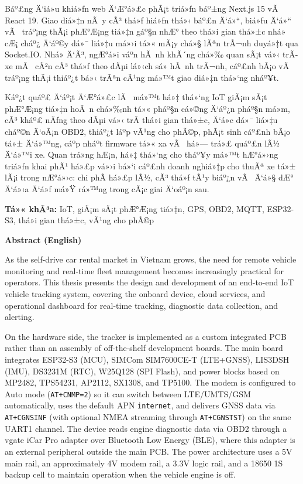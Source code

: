 \documentclass[a4paper]{extarticle}
\begin{document}
Báº£ng Ä‘iá»u khiá»ƒn web Ä‘Æ°á»£c phÃ¡t triá»ƒn báº±ng Next.js 15 vÃ  React 19. Giao
 diá»‡n nÃ y cÃ³ thá»ƒ hiá»ƒn thá»‹ báº£n Ä‘á»“, biá»ƒu Ä‘á»“ vÃ  tráº¡ng thÃ¡i phÆ°Æ¡ng tiá»‡n gáº§n
nhÆ° theo thá»i gian thá»±c nhá» cÆ¡ cháº¿ Ä‘áº©y dá»¯ liá»‡u má»›i tá»« mÃ¡y chá»§ lÃªn trÃ¬nh
duyá»‡t qua Socket.IO. Nhá» Ä‘Ã³, ngÆ°á»i váº­n hÃ nh khÃ´ng chá»‰ quan sÃ¡t vá»‹ trÃ­ xe
mÃ  cÃ²n cÃ³ thá»ƒ theo dÃµi lá»‹ch sá»­ hÃ nh trÃ¬nh, cáº£nh bÃ¡o vÃ  tráº¡ng thÃ¡i thiáº¿t
bá»‹ trÃªn cÃ¹ng má»™t giao diá»‡n thá»‘ng nháº¥t.

Káº¿t quáº£ Ä‘áº¡t Ä‘Æ°á»£c lÃ  má»™t há»‡ thá»‘ng IoT giÃ¡m sÃ¡t phÆ°Æ¡ng tiá»‡n hoÃ n chá»‰nh tá»«
pháº§n cá»©ng Ä‘áº¿n pháº§n má»m, cÃ³ kháº£ nÄƒng theo dÃµi vá»‹ trÃ­ thá»i gian thá»±c, Ä‘á»c
dá»¯ liá»‡u cháº©n Ä‘oÃ¡n OBD2, thiáº¿t láº­p vÃ¹ng cho phÃ©p, phÃ¡t sinh cáº£nh bÃ¡o tá»±
Ä‘á»™ng, cáº­p nháº­t firmware tá»« xa vÃ  há»— trá»£ quáº£n lÃ½ Ä‘á»™i xe. Quan trá»ng hÆ¡n,
há»‡ thá»‘ng cho tháº¥y má»™t hÆ°á»›ng triá»ƒn khai phÃ¹ há»£p vá»›i bá»‘i cáº£nh doanh nghiá»‡p
cho thuÃª xe tá»± lÃ¡i trong nÆ°á»›c: chi phÃ­ há»£p lÃ½, cÃ³ thá»ƒ tÃ¹y biáº¿n vÃ  Ä‘á»§ dÆ°
Ä‘á»‹a Ä‘á»ƒ má»Ÿ rá»™ng trong cÃ¡c giai Ä‘oáº¡n sau.

\textbf{Tá»« khÃ³a:} IoT, giÃ¡m sÃ¡t phÆ°Æ¡ng tiá»‡n, GPS, OBD2, MQTT, ESP32-S3,
thá»i gian thá»±c, vÃ¹ng cho phÃ©p

\textbf{Abstract (English)}

As the self-drive car rental market in Vietnam grows, the need for
remote vehicle monitoring and real-time fleet management becomes
increasingly practical for operators. This thesis presents the design
and development of an end-to-end IoT vehicle tracking system, covering
the onboard device, cloud services, and operational dashboard for
real-time tracking, diagnostic data collection, and alerting.

On the hardware side, the tracker is implemented as a custom integrated
PCB rather than an assembly of off-the-shelf development boards. The
main board integrates ESP32-S3 (MCU), SIMCom SIM7600CE-T (LTE+GNSS),
LIS3DSH (IMU), DS3231M (RTC), W25Q128 (SPI Flash), and power blocks based
on MP2482, TPS54231, AP2112, SX1308, and TP5100. The modem is configured
to Auto mode (\texttt{AT+CNMP=2}) so it can switch between LTE/UMTS/GSM
automatically, uses the default APN \texttt{internet}, and delivers GNSS
data via \texttt{AT+CGNSINF} (with optional NMEA streaming through
\texttt{AT+CGNSTST}) on the same UART1 channel. The device reads engine
diagnostic data via OBD2 through a vgate iCar Pro adapter over Bluetooth
Low Energy (BLE), where this adapter is an external peripheral outside
the main PCB. The power architecture uses a 5V main rail, an
approximately 4V modem rail, a 3.3V logic rail, and a 18650 1S backup
cell to maintain operation when the vehicle engine is off.
\end{document}
